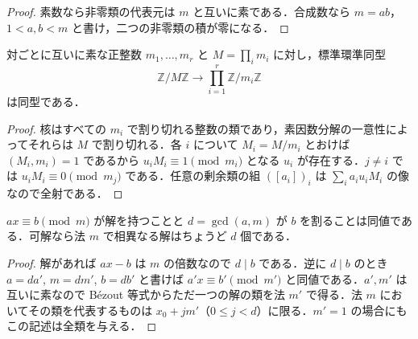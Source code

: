 \begin{proof}
素数なら非零類の代表元は $m$ と互いに素である．合成数なら $m=ab$，$1<a,b<m$ と書け，二つの非零類の積が零になる．
\end{proof}
\begin{prop}[中国剰余定理]
対ごとに互いに素な正整数 $m_1,\ldots,m_r$ と $M=\prod_i m_i$ に対し，標準環準同型
\[
\mathbb Z/M\mathbb Z\longrightarrow\prod_{i=1}^r\mathbb Z/m_i\mathbb Z
\]
は同型である．
\end{prop}
\begin{proof}
核はすべての $m_i$ で割り切れる整数の類であり，素因数分解の一意性によってそれらは $M$ で割り切れる．各 $i$ について $M_i=M/m_i$ とおけば $(M_i,m_i)=1$ であるから $u_iM_i\equiv1\pmod{m_i}$ となる $u_i$ が存在する．$j\ne i$ では $u_iM_i\equiv0\pmod{m_j}$ である．任意の剰余類の組 $([a_i])_i$ は $\sum_i a_i u_iM_i$ の像なので全射である．
\end{proof}
\begin{prop}[一次合同式の可解性]
$ax\equiv b\pmod m$ が解を持つことと $d=\gcd(a,m)$ が $b$ を割ることは同値である．可解なら法 $m$ で相異なる解はちょうど $d$ 個である．
\end{prop}
\begin{proof}
解があれば $ax-b$ は $m$ の倍数なので $d\mid b$ である．逆に $d\mid b$ のとき $a=da'$, $m=dm'$, $b=db'$ と書けば $a'x\equiv b'\pmod{m'}$ と同値である．$a',m'$ は互いに素なので Bézout 等式からただ一つの解の類を法 $m'$ で得る．法 $m$ においてその類を代表するものは $x_0+jm'$（$0\leq j<d$）に限る．$m'=1$ の場合にもこの記述は全類を与える．
\end{proof}
